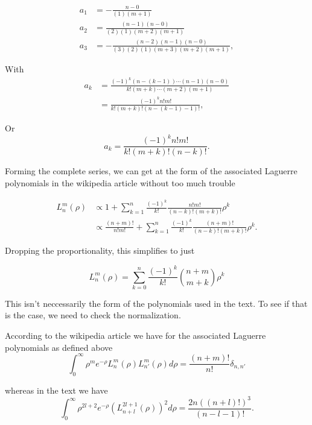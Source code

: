 \begin{align*}
a_1 &= -\frac{n-0}{(1)(m+1)} \\
a_2 &= \frac{(n-1)(n-0)}{(2)(1)(m+2)(m+1)} \\
a_3 &= -\frac{(n-2)(n-1)(n-0)}{(3)(2)(1)(m+3)(m+2)(m+1)},
\end{align*}

With
\begin{align*}
a_k 
&= \frac{(-1)^k (n-(k-1))\cdots(n-1)(n-0)}{k!(m+k)\cdots(m+2)(m+1)} \\
&= \frac{(-1)^k n! m!}{k!(m+k)!(n-(k-1) -1)!},
\end{align*}

Or
\begin{equation}\label{eqn:hyrdogenLaguerre:130}
a_k 
= \frac{(-1)^k n! m!}{k!(m+k)!(n-k)!}.
\end{equation}

Forming the complete series, we can get at the form of the associated Laguerre polynomials in the wikipedia article without too much trouble

\begin{align*}
L_n^m(\rho) 
&\propto 1 + \sum_{k=1}^n \frac{(-1)^k}{k!} \frac{n! m!}{(n-k)!(m+k)!} \rho^k \\
&\propto \frac{(n+m)!}{n!m!} + \sum_{k=1}^n \frac{(-1)^k}{k!} \frac{(n+m)!}{(n-k)!(m+k)!} \rho^k.
\end{align*}

Dropping the proportionality, this simplifies to just

\begin{equation}\label{eqn:hyrdogenLaguerre:140}
L_n^m(\rho) = \sum_{k=0}^n \frac{(-1)^k}{k!} \binom{n+m}{m+k} \rho^k
\end{equation}

This isn't neccessarily the form of the polynomials used in the text.  To see if that is the case, we need to check the normalization.

According to the wikipedia article we have for the associated Laguerre polynomials as defined above
\begin{equation}\label{eqn:hyrdogenLaguerre:150}
\int_0^{\infty}\rho^m e^{-\rho} L_n^{m}(\rho)L_{n'}^{m}(\rho)d\rho = \frac{(n+m)!}{n!}\delta_{n,{n'}}
\end{equation}

whereas in the text we have
\begin{equation}\label{eqn:hyrdogenLaguerre:150b}
\int_0^{\infty}\rho^{2l + 2} e^{-\rho} \left( L_{n+l}^{2l + 1}(\rho) \right)^2 d\rho = \frac{2n ((n+l)!)^3}{(n-l-1)!}.
\end{equation}

